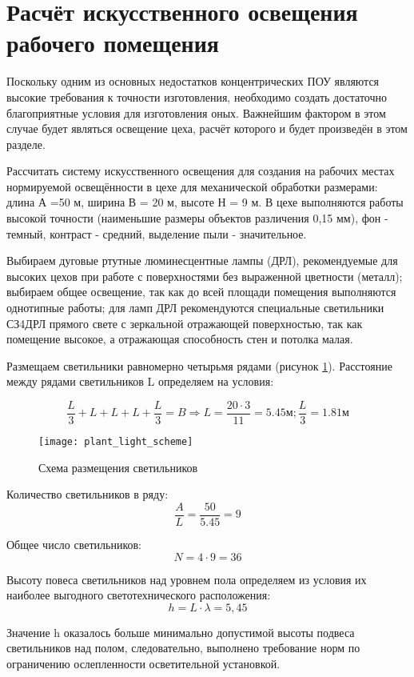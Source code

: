 \section{Расчёт искусственного освещения рабочего помещения}
Поскольку одним из основных недостатков концентрических ПОУ являются высокие требования к точности изготовления, необходимо создать достаточно благоприятные условия для изготовления оных. Важнейшим фактором в этом случае будет являться освещение цеха, расчёт которого и будет произведён в этом разделе.

Рассчитать систему искусственного освещения для создания на рабочих местах нормируемой освещённости в цехе для механической обработки размерами: длина А =50 м, ширина В = 20 м, высоте Н = 9 м. В цехе выполняются работы высокой точности (наименьшие размеры объектов различения 0,15 мм), фон - темный, контраст - средний, выделение пыли -  значительное. 

Выбираем дуговые ртутные люминесцентные лампы (ДРЛ), рекомендуемые для высоких цехов при работе с поверхностями без выраженной цветности (металл); выбираем общее освещение, так как до всей площади помещения выполняются однотипные работы; для ламп ДРЛ рекомендуются специальные светильники СЗ4ДРЛ прямого свете с зеркальной отражающей поверхностью, так как помещение высокое, а отражающая способность стен и потолка малая. 

Размещаем светильники равномерно четырьмя рядами (рисунок \ref{fig:plant_light_scheme}). Расстояние между рядами светильников L определяем на условия:

$$ \frac{L}{3} + L + L + L + \frac{L}{3} = B \Rightarrow L = \frac{20 \cdot 3}{11}=5.45 м; \frac{L}{3} = 1.81 м $$

\begin{figure}[!h]
\begin{center}
	\texttt{[image: plant\_light\_scheme]}
	\caption{Схема размещения светильников}
	\label{fig:plant_light_scheme}
\end{center}
\end{figure}

Количество светильников в ряду:
$$ \frac{A}{L} = \frac{50}{5.45} = 9 $$

Общее число светильников:
$$ N = 4 \cdot 9 = 36 $$

Высоту повеса светильников над уровнем пола определяем из условия их наиболее выгодного светотехнического расположения:
$$ h =L \cdot \lambda=5,45 $$

Значение h оказалось больше минимально допустимой высоты подвеса светильников над полом, следовательно, выполнено требование норм по ограничению ослепленности осветительной установкой. 

